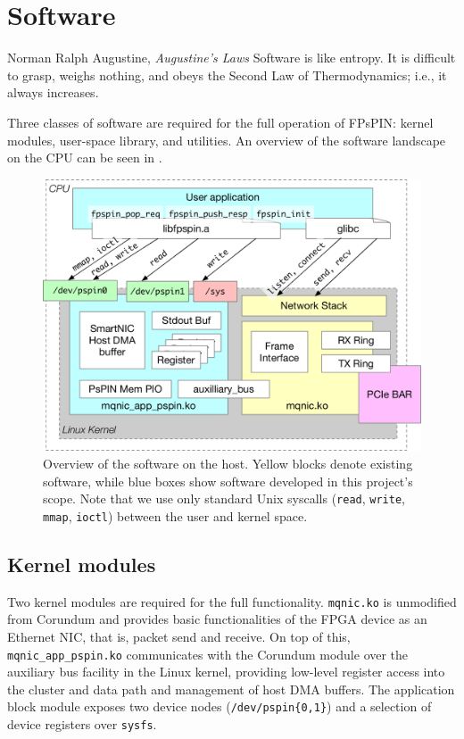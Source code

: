 \chapter{Software} \label{chap:software}
\begin{chapquote}{Norman Ralph Augustine, \textit{Augustine's Laws}}
Software is like entropy. It is difficult to grasp, weighs nothing, and obeys the Second Law of Thermodynamics; i.e., it always increases.
\end{chapquote}

Three classes of software are required for the full operation of FPsPIN: kernel modules, user-space library, and utilities.  An overview of the software landscape on the CPU can be seen in .

\begin{figure}
    \centering
    \includegraphics[width=\linewidth]{figures/sw-overview.pdf}
    \caption{Overview of the software on the host.  Yellow blocks denote existing software, while blue boxes show software developed in this project's scope.  Note that we use only standard Unix syscalls (\texttt{read}, \texttt{write}, \texttt{mmap}, \texttt{ioctl}) between the user and kernel space.}
    \label{fig:sw-overview}
\end{figure}

\section{Kernel modules} \label{sec:sw-kmod}

Two kernel modules are required for the full functionality.  \texttt{mqnic.ko} is unmodified from Corundum and provides basic functionalities of the FPGA device as an Ethernet NIC, that is, packet send and receive.  On top of this, \texttt{mqnic\_app\_pspin.ko} communicates with the Corundum module over the auxiliary bus facility in the Linux kernel, providing low-level register access into the cluster and data path and management of host DMA buffers.  The application block module exposes two device nodes (\texttt{/dev/pspin\{0,1\}}) and a selection of device registers over \texttt{sysfs}.

